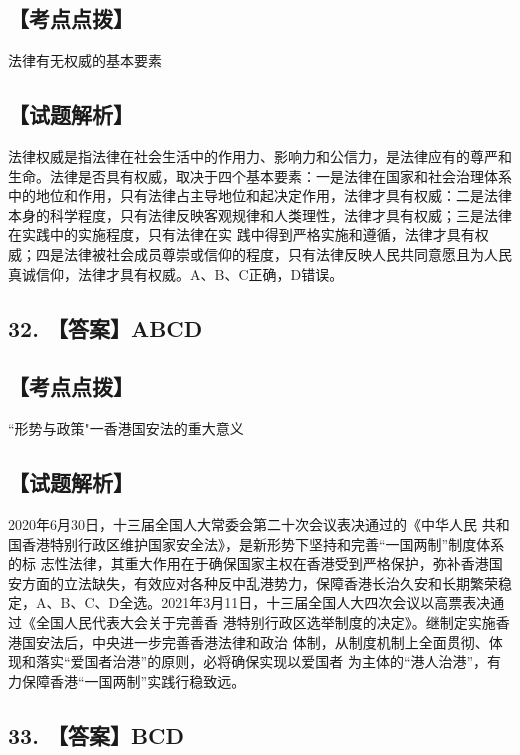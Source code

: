 \documentclass[UTF8,11pt]{ctexart}
\begin{document}
\subsection*{【考点点拨】}

法律有无权威的基本要素


\subsection*{【试题解析】}

法律权威是指法律在社会生活中的作用力、影响力和公信力，是法律应有的尊严和生命。法律是否具有权威，取决于四个基本要素：一是法律在国家和社会治理体系中的地位和作用，只有法律占主导地位和起决定作用，法律才具有权威：二是法律本身的科学程度，只有法律反映客观规律和人类理性，法律才具有权威；三是法律在实践中的实施程度，只有法律在实 践中得到严格实施和遵循，法律才具有权威；四是法律被社会成员尊崇或信仰的程度，只有法律反映人民共同意愿且为人民真诚信仰，法律才具有权威。A、B、C正确，D错误。


\subsection*{32. 【答案】ABCD}

\subsection*{【考点点拨】}

“形势与政策"一香港国安法的重大意义


\subsection*{【试题解析】}

2020年6月30日，十三届全国人大常委会第二十次会议表决通过的《中华人民 共和国香港特别行政区维护国家安全法》，是新形势下坚持和完善“一国两制”制度体系的标 志性法律，其重大作用在于确保国家主权在香港受到严格保护，弥补香港国安方面的立法缺失，有效应对各种反中乱港势力，保障香港长治久安和长期繁荣稳定，A、B、C、D全选。2021年3月11日，十三届全国人大四次会议以高票表决通过《全国人民代表大会关于完善香 港特别行政区选举制度的决定》。继制定实施香港国安法后，中央进一步完善香港法律和政治 体制，从制度机制上全面贯彻、体现和落实“爱国者治港”的原则，必将确保实现以爱国者 为主体的“港人治港”，有力保障香港“一国两制”实践行稳致远。


\subsection*{33. 【答案】BCD}
\end{document}
